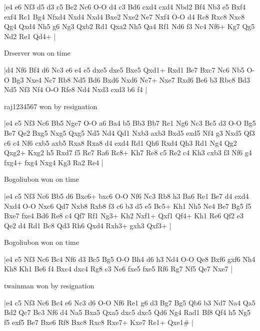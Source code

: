 \makegametitle
|e4 e6 Nf3 d5 d3 c5 Be2 Nc6 O-O d4 c3 Bd6 cxd4 cxd4 Nbd2 Bf4 Nb3 e5 Bxf4 exf4 Rc1 Bg4 Nfxd4 Nxd4 Nxd4 Bxe2 Nxe2 Ne7 Nxf4 O-O d4 Rc8 Rxc8 Nxc8 Qg4 Qxd4 Nh5 g6 Ng3 Qxb2 Rd1 Qxa2 Nh5 Qa4 Rf1 Nd6 f3 Nc4 Nf6+ Kg7 Qg5 Nd2 Re1 Qd4+  |

\showboard

Drserver won on time

\makegametitle
|d4 Nf6 Bf4 d6 Nc3 e6 e4 e5 dxe5 dxe5 Bxe5 Qxd1+ Rxd1 Be7 Bxc7 Nc6 Nb5 O-O Bg3 Nxe4 Nc7 Rb8 Nd5 Bd6 Bxd6 Nxd6 Ne7+ Nxe7 Rxd6 Be6 b3 Rbc8 Bd3 Nd5 Nf3 Nf4 O-O Rfe8 Nd4 Nxd3 cxd3 b6 f4  |

\showboard

raj1234567 won by resignation

\makegametitle
|e4 e5 Nf3 Nc6 Bb5 Nge7 O-O a6 Ba4 b5 Bb3 Bb7 Re1 Ng6 Nc3 Bc5 d3 O-O Bg5 Be7 Qe2 Bxg5 Nxg5 Qxg5 Nd5 Nd4 Qd1 Nxb3 axb3 Bxd5 exd5 Nf4 g3 Nxd5 Qf3 c6 c4 Nf6 cxb5 axb5 Rxa8 Rxa8 d4 exd4 Rd1 Qh6 Rxd4 Qh3 Rd1 Ng4 Qg2 Qxg2+ Kxg2 h5 Rxd7 f5 Rc7 Ra6 Rc8+ Kh7 Re8 c5 Re2 c4 Kh3 cxb3 f3 Nf6 g4 fxg4+ fxg4 Nxg4 Kg3 Ra2 Re4  |

\showboard

Bogoliubon won on time

\makegametitle
|e4 e5 Nf3 Nc6 Bb5 d6 Bxc6+ bxc6 O-O Nf6 Nc3 Rb8 h3 Ba6 Re1 Be7 d4 exd4 Nxd4 O-O Nxc6 Qd7 Nxb8 Rxb8 f3 c6 b3 d5 e5 Bc5+ Kh1 Nh5 Ne4 Be7 Bg5 f5 Bxe7 fxe4 Bd6 Re8 c4 Qf7 Rf1 Ng3+ Kh2 Nxf1+ Qxf1 Qf4+ Kh1 Re6 Qf2 e3 Qe2 d4 Rd1 Bc8 Qd3 Rh6 Qxd4 Rxh3+ gxh3 Qxf3+  |

\showboard

Bogoliubon won on time

\makegametitle
|e4 e5 Nf3 Nc6 Bc4 Nf6 d3 Bc5 Bg5 O-O Bh4 d6 h3 Nd4 O-O Qe8 Bxf6 gxf6 Nh4 Kh8 Kh1 Be6 f4 Bxc4 dxc4 Rg8 c3 Ne6 fxe5 fxe5 Rf6 Rg7 Nf5 Qe7 Nxe7  |

\showboard

twainman won by resignation

\makegametitle
|e4 c5 Nf3 Nc6 Bc4 e6 Nc3 d6 O-O Nf6 Re1 g6 d3 Bg7 Bg5 Qb6 b3 Nd7 Na4 Qa5 Bd2 Qc7 Bc3 Nf6 d4 Na5 Bxa5 Qxa5 dxc5 dxc5 Qd6 Ng4 Rad1 Bf8 Qf4 h5 Ng5 f5 exf5 Be7 Bxe6 Rf8 Bxc8 Rxc8 Rxe7+ Kxe7 Re1+ Qxe1\#  |

